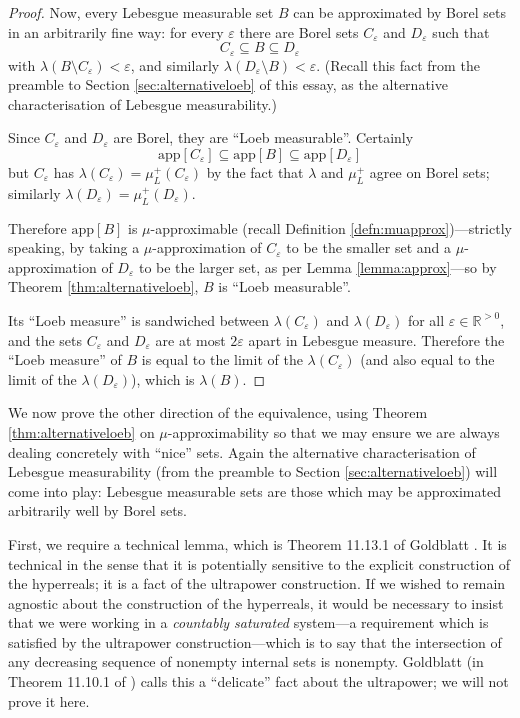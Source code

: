 \documentclass[11pt]{amsart}
\theoremstyle{remark}
\newcommand{\app}[1]{\mathrm{app}\left[#1\right]}
\begin{document}
\begin{proof}
Now, every Lebesgue measurable set $B$ can be approximated by Borel sets in an arbitrarily fine way: for every $\varepsilon$ there are Borel sets $C_{\varepsilon}$ and $D_{\varepsilon}$ such that $$C_{\varepsilon} \subseteq B \subseteq D_{\varepsilon}$$
with $\lambda(B \setminus C_{\varepsilon}) < \varepsilon$, and similarly $\lambda(D_{\varepsilon} \setminus B) < \varepsilon$.
(Recall this fact from the preamble to Section \ref{sec:alternativeloeb} of this essay, as the alternative characterisation of Lebesgue measurability.)

Since $C_{\varepsilon}$ and $D_{\varepsilon}$ are Borel, they are ``Loeb measurable''.
Certainly $$\app{C_{\varepsilon}} \subseteq \app{B} \subseteq \app{D_{\varepsilon}}$$
but $C_{\varepsilon}$ has $\lambda(C_{\varepsilon}) = \mu_L^+(C_{\varepsilon})$ by the fact that $\lambda$ and $\mu_L^+$ agree on Borel sets; similarly $\lambda(D_{\varepsilon}) = \mu_L^+(D_{\varepsilon})$.

Therefore $\app{B}$ is $\mu$-approxim\-able (recall Definition \ref{defn:muapprox})---strictly speaking, by taking a $\mu$-approximation of $C_{\varepsilon}$ to be the smaller set and a $\mu$-approximation of $D_{\varepsilon}$ to be the larger set, as per Lemma \ref{lemma:approx}---so by Theorem \ref{thm:alternativeloeb}, $B$ is ``Loeb measurable''.

Its ``Loeb measure'' is sandwiched between $\lambda(C_{\varepsilon})$ and $\lambda(D_{\varepsilon})$ for all $\varepsilon \in \mathbb{R}^{>0}$, and the sets $C_{\varepsilon}$ and $D_{\varepsilon}$ are at most $2 \varepsilon$ apart in Lebesgue measure.
Therefore the ``Loeb measure'' of $B$ is equal to the limit of the $\lambda(C_{\varepsilon})$ (and also equal to the limit of the $\lambda(D_{\varepsilon})$), which is $\lambda(B)$.
\end{proof}

We now prove the other direction of the equivalence, using Theorem \ref{thm:alternativeloeb} on $\mu$-approxima\-bility so that we may ensure we are always dealing concretely with ``nice'' sets.
Again the alternative characterisation of Lebesgue measurability (from the preamble to Section \ref{sec:alternativeloeb}) will come into play: Lebesgue measurable sets are those which may be approximated arbitrarily well by Borel sets.

First, we require a technical lemma, which is Theorem 11.13.1 of Goldblatt \cite{goldblatt}.
It is technical in the sense that it is potentially sensitive to the explicit construction of the hyperreals; it is a fact of the ultrapower construction.
If we wished to remain agnostic about the construction of the hyperreals, it would be necessary to insist that we were working in a \emph{countably saturated} system---a requirement which is satisfied by the ultrapower construction---which is to say that the intersection of any decreasing sequence of nonempty internal sets is nonempty.
Goldblatt (in Theorem 11.10.1 of \cite{goldblatt}) calls this a ``delicate'' fact about the ultrapower; we will not prove it here.
\end{document}
